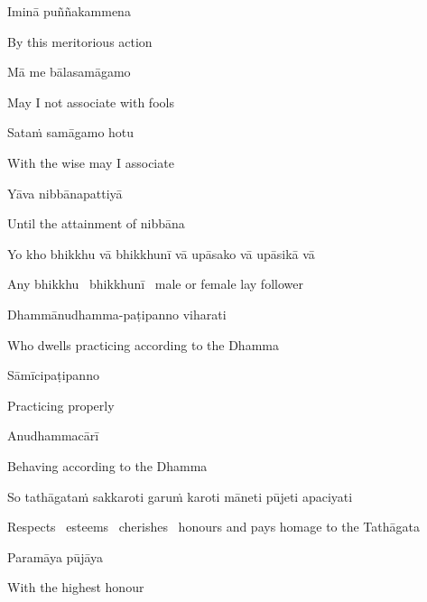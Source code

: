 Iminā puññakammena

\begin{english}
  By this meritorious action
\end{english}

Mā me bālasamāgamo

\begin{english}
  May I not associate with fools
\end{english}

Sataṁ samāgamo hotu

\begin{english}
  With the wise may I associate
\end{english}

Yāva nibbānapattiyā

\begin{english}
  Until the attainment of nibbāna
\end{english}


Yo kho bhikkhu vā bhikkhunī vā upāsako vā upāsikā vā

\begin{english}
  Any bhikkhu \breathmark\ bhikkhunī \breathmark\ male or female lay follower
\end{english}

Dhammānudhamma-paṭipanno viharati

\begin{english}
  Who dwells practicing according to the Dhamma
\end{english}

Sāmīcipaṭipanno

\begin{english}
  Practicing properly
\end{english}

Anudhammacārī

\begin{english}
  Behaving according to the Dhamma
\end{english}

So tathāgataṁ sakkaroti garuṁ karoti māneti pūjeti apaciyati

\begin{english}
  Respects \breathmark\ esteems \breathmark\ cherishes \breathmark\ honours and pays homage to the Tathāgata
\end{english}

Paramāya pūjāya

\begin{english}
  With the highest honour
\end{english}

